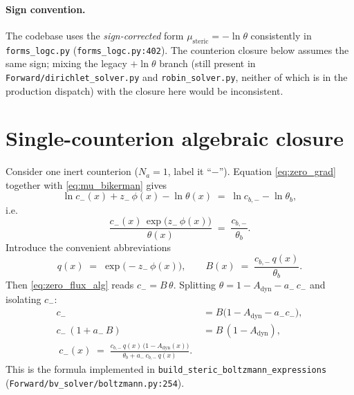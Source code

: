 \documentclass[11pt]{article}
\begin{document}
\paragraph{Sign convention.}
The codebase uses the \emph{sign-corrected} form
$\mu_{\mathrm{steric}} = -\ln\theta$ consistently in
\texttt{forms\_logc.py} (\texttt{forms\_logc.py:402}). The
counterion closure below assumes the same sign; mixing the legacy
$+\ln\theta$ branch (still present in \texttt{Forward/dirichlet\_solver.py}
and \texttt{robin\_solver.py}, neither of which is in the production
dispatch) with the closure here would be inconsistent.

\section{Single-counterion algebraic closure}

Consider one inert counterion ($N_a = 1$, label it ``$-$''). Equation
\eqref{eq:zero_grad} together with \eqref{eq:mu_bikerman} gives
\begin{equation}
\ln c_-(x) + z_-\,\phi(x) - \ln\theta(x)
\;=\; \ln c_{b,-} - \ln\theta_b,
\label{eq:mu_match}
\end{equation}
i.e.
\begin{equation}
\frac{c_-(x)\,\exp\!\bigl(z_-\,\phi(x)\bigr)}{\theta(x)}
\;=\; \frac{c_{b,-}}{\theta_b}.
\label{eq:zero_flux_alg}
\end{equation}
Introduce the convenient abbreviations
\begin{equation}
q(x) \;=\; \exp\!\bigl(-z_-\,\phi(x)\bigr),
\qquad
B(x) \;=\; \frac{c_{b,-}\,q(x)}{\theta_b}.
\end{equation}
Then \eqref{eq:zero_flux_alg} reads $c_- = B\,\theta$. Splitting
$\theta = 1 - A_{\mathrm{dyn}} - a_-\,c_-$ and isolating $c_-$:
\begin{align}
c_- &= B\bigl(1 - A_{\mathrm{dyn}} - a_- c_-\bigr), \\
c_-\,(1 + a_-\,B) &= B\,(1 - A_{\mathrm{dyn}}), \\
\boxed{\;
c_-(x) \;=\; \frac{c_{b,-}\,q(x)\,\bigl(1-A_{\mathrm{dyn}}(x)\bigr)}
                  {\theta_b + a_-\,c_{b,-}\,q(x)}.
\;}
\label{eq:single_closure}
\end{align}
This is the formula implemented in
\texttt{build\_steric\_boltzmann\_expressions}
(\texttt{Forward/bv\_solver/boltzmann.py:254}).
\end{document}
